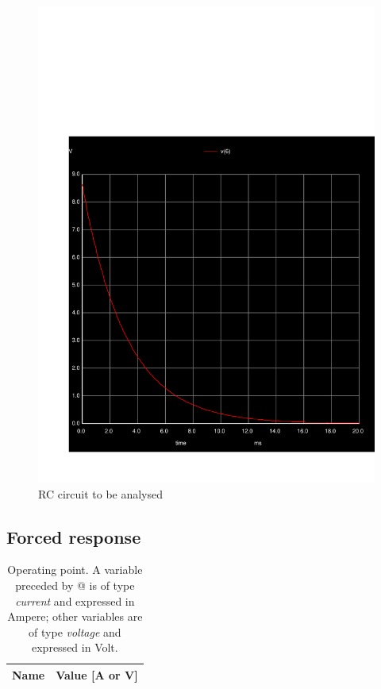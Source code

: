   \begin{figure}[H] \centering
    \includegraphics[width=1\linewidth]{../sim/trans3.pdf}
    \caption{RC circuit to be analysed}
    \label{fig:t2}
    \end{figure}

  \subsection{Forced response}

  \begin{table}[H]
    \centering
    \begin{tabular}{|l|r|}
      \hline    
      {\bf Name} & {\bf Value [A or V]} \\ \hline
      
    \end{tabular}
    \caption{Operating point. A variable preceded by @ is of type {\em current}
      and expressed in Ampere; other variables are of type {\it voltage} and expressed in
      Volt.}
    \label{tab:p4}
  \end{table}

